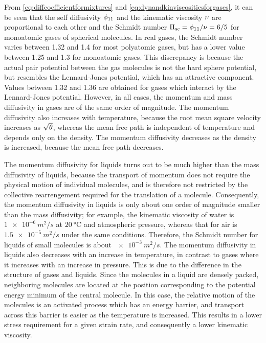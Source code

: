 From \cref{eq:diffcoefficientformixtures} and \cref{eq:dynandkinviscositiesforgases}, it can be seen that the self diffusivity $\phi_{11}$ and the kinematic viscosity $\nu$ are proportional to each other and the Schmidt number $\Pi_\text{sc} = \phi_{11}/\nu = 6/5$ for monoatomic gases of spherical molecules. In real gases, the Schmidt number varies between 1.32 and 1.4 for most polyatomic gases, but has a lower value between 1.25 and 1.3 for monoatomic gases. This discrepancy is because the actual pair potential between the gas molecules is not the hard sphere potential, but resembles the Lennard-Jones potential, which has an attractive component. Values between 1.32 and 1.36 are obtained for gases which interact by the Lennard-Jones potential. However, in all cases, the momentum and mass diffusivity in gases are of the same order of magnitude. The momentum diffusivity also increases with temperature, because the root mean square velocity increases as $\sqrt{\theta}$, whereas the mean free path is independent of temperature and depends only on the density. The momentum diffusivity decreases as the density is increased, because the mean free path decreases.

The momentum diffusivity for liquids turns out to be much higher than the mass diffusivity of liquids, because the transport of momentum does not require the physical motion of individual molecules, and is therefore not restricted by the collective rearrengement required for the translation of a molecule. Consequently, the momentum diffusivity in liquids is only about one order of magnitude smaller than the mass diffusivity; for example, the kinematic viscosity of water is $\SI{1e-6}{m^2/s}$ at $\SI{20}{\celsius}$ and atmospheric pressure, whereas that for air is $\SI{1.5e-5}{m^2/s}$ under the same conditions. Therefore, the Schmidt number for liquids of small molecules is about $\SI{e-3}{m^2/s}$. The momentum diffusivity in liquids also decreases with an increase in temperature, in contrast to gases where it increases with an increase in pressure. This is due to the difference in the structure of gases and liquids. Since the molecules in a liquid are densely packed, neighboring molecules are located at the position corresponding to the potential energy minimum of the central molecule. In this case, the relative motion of the molecules is an activated process which has an energy barrier, and transport across this barrier is easier as the temperature is increased. This results in a lower stress requirement for a given strain rate, and consequently a lower kinematic viscosity.


